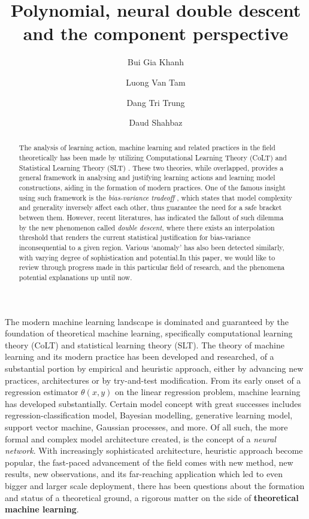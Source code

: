 \documentclass[
  journal=largetwo,
  year=2025,
  volume=37,
]{cup-journal}
\title{Polynomial, neural double descent and the component perspective}
\author{Bui Gia Khanh}
\affiliation{Department of Physics, Hanoi University of Science, Vietnam National University, Hanoi Vietnam}
\author{Luong Van Tam}
\affiliation{Department of Physics, Hanoi University of Science, Vietnam National University, Hanoi Vietnam}
\author{Dang Tri Trung}
\affiliation{Monash University, Department of Computer Science, Melbourne, Australia}
\author{Daud Shahbaz}
\affiliation{COMSATS University Islamabad, Islamabad, Pakistan}
\begin{document}
\begin{abstract}
    The analysis of learning action, machine learning and related practices in the field theoretically has been made by utilizing Computational Learning Theory (CoLT) \cite{10.1145/1968.1972} and Statistical Learning Theory (SLT) \cite{Vapnik1999-VAPTNO}. These two theories, while overlapped, provides a general framework in analysing and justifying learning actions and learning model constructions, aiding in the formation of modern practices. One of the famous insight using such framework is the \textit{bias-variance tradeoff} \cite{6797087}, which states that model complexity and generality inversely affect each other, thus guarantee the need for a safe bracket between them. However, recent literatures, \cite{belkin_reconciling_2019} has indicated the fallout of such dilemma by the new phenomenon called \textit{double descent}, where there exists an interpolation threshold that renders the current statistical justification for bias-variance inconsequential to a given region. Various `anomaly' has also been detected similarly, with varying degree of sophistication and potential.In this paper, we would like to review through progress made in this particular field of research, and the phenomena potential explanations up until now. 
\end{abstract}

The modern machine learning landscape is dominated and guaranteed by the foundation of theoretical machine learning, specifically computational learning theory (CoLT) and statistical learning theory (SLT). The theory of machine learning and its modern practice has been developed and researched, of a substantial portion by empirical and heuristic approach, either by advancing new practices, architectures or by try-and-test modification. From its early onset of a regression estimator $\theta(x,y)$ on the linear regression problem, machine learning has developed substantially. Certain model concept with great successes includes regression-classification model, Bayesian modelling, generative learning model, support vector machine, Gaussian processes, and more. Of all such, the more formal and complex model architecture created, is the concept of a \textit{neural network}. With increasingly sophisticated architecture, heuristic approach become popular, the fast-paced advancement of the field comes with new method, new results, new observations, and its far-reaching application which led to even bigger and larger scale deployment, there has been questions about the formation and status of a theoretical ground, a rigorous matter on the side of \textbf{theoretical machine learning}.
\end{document}
